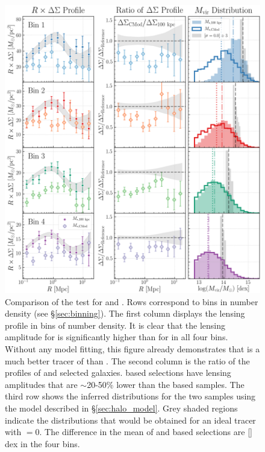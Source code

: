 \documentclass[fleqn,usenatbib,useAMS,english]{mnras}
\begin{document}
  \begin{figure}
      \centering
      \includegraphics[width=15cm]{figure/topn_dsigma_m100_cmod_compare}
      \caption{
          Comparison of the \topn{} test for  and \mcmodel{}.
          Rows correspond to bins in number density (see \S \ref{sec:binning}).
          The first column displays the lensing profile \dsigma{} in bins of number density. It
          is clear that the lensing amplitude for  is significantly higher than for
          \mcmodel{} in all four bins.
          Without any model fitting, this figure already demonstrates that  is a much
          better tracer of \mvir{} than \mcmodel{}.
          The second column is the ratio of the \dsigma{} profiles of \mcmodel{} and 
          selected galaxies.
          \mcmodel{} based selections
          have lensing amplitudes that are $\sim$20-50\% lower than the  based samples.
          The
          third row shows the inferred \mvir{} distributions for the two samples using the
          model described in \S \ref{sec:halo_model}.
          Grey shaded regions indicate the distributions that would be
          obtained for an ideal tracer with \sigmh{}$=0$.
          The difference in the mean \mvir{} of
          \mcmodel{} and \maper{} based selections are [\todo{}] dex in the four bins.
          }
      \label{fig:m100_cmod}
  \end{figure}
\end{document}

